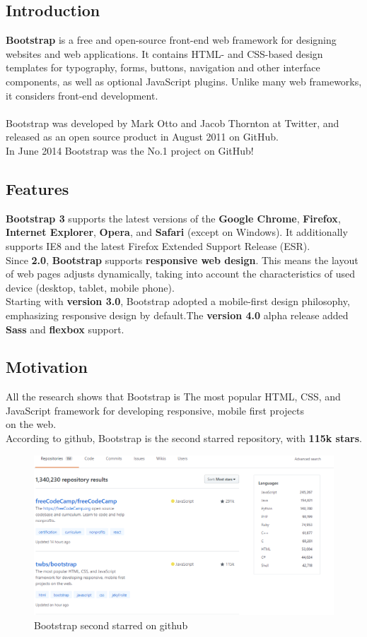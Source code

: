 	\subsection{Introduction}
	\textbf{Bootstrap} is a free and open-source front-end web framework for designing websites and web applications. It contains HTML- and CSS-based design templates for typography, forms, buttons, navigation and other interface components, as well as optional JavaScript plugins. Unlike many web frameworks, it considers front-end development.
	\\
	\\
	Bootstrap was developed by Mark Otto and Jacob Thornton at Twitter, and released as an open source product in August 2011 on GitHub.\\
	In June 2014 Bootstrap was the No.1 project on GitHub!
	\subsection{Features}
	\textbf{Bootstrap 3} supports the latest versions of the \textbf{Google Chrome}, \textbf{Firefox}, \textbf{Internet Explorer}, \textbf{Opera}, and \textbf{Safari} (except on Windows). It additionally supports IE8 and the latest Firefox Extended Support Release (ESR).
	\\
	Since \textbf{2.0}, \textbf{Bootstrap} supports \textbf{responsive web design}. This means the layout of web pages adjusts dynamically, taking into account the characteristics of used device (desktop, tablet, mobile phone).
	\\
	Starting with \textbf{version 3.0}, Bootstrap adopted a mobile-first design philosophy, emphasizing responsive design by default.The \textbf{version 4.0} alpha release added \textbf{Sass} and \textbf{flexbox} support.
	\subsection{Motivation}
	All the research shows that Bootstrap is The most popular HTML, CSS, and JavaScript framework for developing responsive, mobile first projects \\ on the web.
	\\
	According to github, Bootstrap is the second starred repository, with \textbf{115k stars}.
		\begin{figure}[h]
		\centering
		\includegraphics[width=1\textwidth]{Boostrap_statics_github.png}
		\caption{Bootstrap second starred on github}
	\end{figure}

